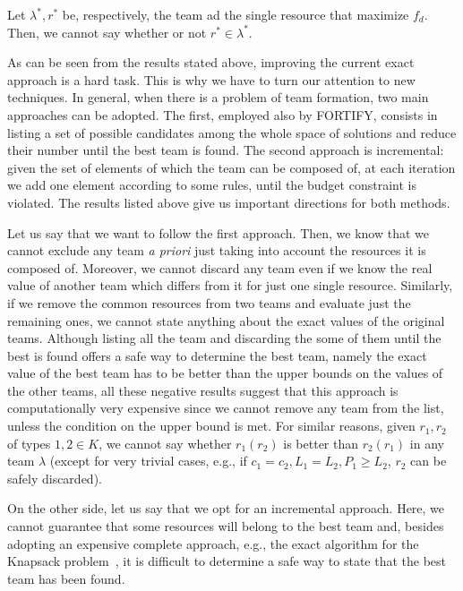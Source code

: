 \begin{corollary}
Let $\lambda^*, r^*$ be, respectively, the team ad the single resource that maximize $f_d$. Then, we cannot say whether or not $r^* \in \lambda^*$.
\end{corollary}

As can be seen from the results stated above, improving the current exact approach is a hard task. This is why we have to turn our attention to new techniques. In general, when there is a problem of team formation, two main approaches can be adopted. The first, employed also by FORTIFY, consists in listing a set of possible candidates among the whole space of solutions and reduce their number until the best team is found. The second approach is incremental: given the set of elements of which the team can be composed of, at each iteration we add one element according to some rules, until the budget constraint is violated. The results listed above give us important directions for both methods.

Let us say that we want to follow the first approach. Then, we know that we cannot exclude any team \emph{a priori} just taking into account the resources it is composed of. Moreover, we cannot discard any team even if we know the real value of another team which differs from it for just one single resource. Similarly, if we remove the common resources from two teams and evaluate just the remaining ones, we cannot state anything about the exact values of the original teams. Although listing all the team and discarding the some of them until the best is found offers a safe way to determine the best team, namely the exact value of the best team has to be better than the upper bounds on the values of the other teams, all these negative results suggest that this approach is computationally very expensive since we cannot remove any team from the list, unless the condition on the upper bound is met. For similar reasons, given $r_1, r_2$ of types $1,2 \in K$, we cannot say whether $r_1 (r_2)$ is better than $r_2 (r_1)$ in any team $\lambda$ (except for very trivial cases, e.g., if $c_1 = c_2, L_1=L_2, P_1 \geq L_2$, $r_2$ can be safely discarded).

On the other side, let us say that we opt for an incremental approach. Here, we cannot guarantee that some resources will belong to the best team and, besides adopting an expensive complete approach, e.g., the exact algorithm for the Knapsack problem~\cite{andonov2000unbounded}, it is difficult to determine a safe way to state that the best team has been found. 